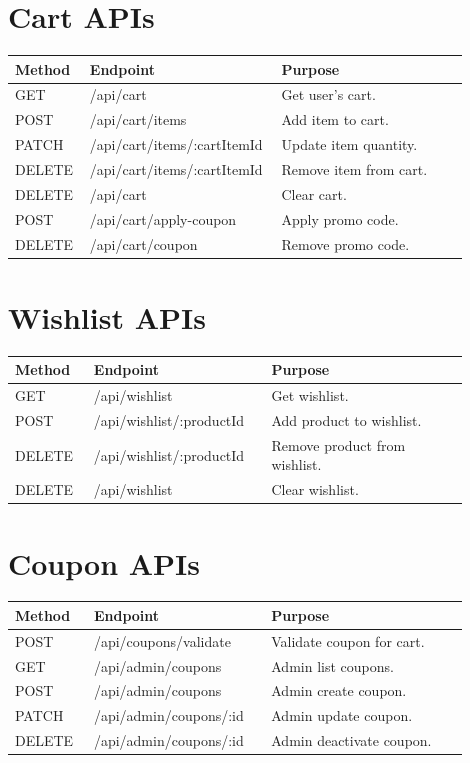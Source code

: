 \documentclass[11pt,a4paper]{article}
\begin{document}
\section{Cart APIs}

\begin{longtable}{p{0.16\linewidth} p{0.34\linewidth} p{0.40\linewidth}}
\toprule
\textbf{Method} & \textbf{Endpoint} & \textbf{Purpose} \\
\midrule
GET & /api/cart & Get user's cart. \\
POST & /api/cart/items & Add item to cart. \\
PATCH & /api/cart/items/:cartItemId & Update item quantity. \\
DELETE & /api/cart/items/:cartItemId & Remove item from cart. \\
DELETE & /api/cart & Clear cart. \\
POST & /api/cart/apply-coupon & Apply promo code. \\
DELETE & /api/cart/coupon & Remove promo code. \\
\bottomrule
\end{longtable}

\section{Wishlist APIs}

\begin{longtable}{p{0.16\linewidth} p{0.34\linewidth} p{0.40\linewidth}}
\toprule
\textbf{Method} & \textbf{Endpoint} & \textbf{Purpose} \\
\midrule
GET & /api/wishlist & Get wishlist. \\
POST & /api/wishlist/:productId & Add product to wishlist. \\
DELETE & /api/wishlist/:productId & Remove product from wishlist. \\
DELETE & /api/wishlist & Clear wishlist. \\
\bottomrule
\end{longtable}

\section{Coupon APIs}

\begin{longtable}{p{0.16\linewidth} p{0.34\linewidth} p{0.40\linewidth}}
\toprule
\textbf{Method} & \textbf{Endpoint} & \textbf{Purpose} \\
\midrule
POST & /api/coupons/validate & Validate coupon for cart. \\
GET & /api/admin/coupons & Admin list coupons. \\
POST & /api/admin/coupons & Admin create coupon. \\
PATCH & /api/admin/coupons/:id & Admin update coupon. \\
DELETE & /api/admin/coupons/:id & Admin deactivate coupon. \\
\bottomrule
\end{longtable}
\end{document}
